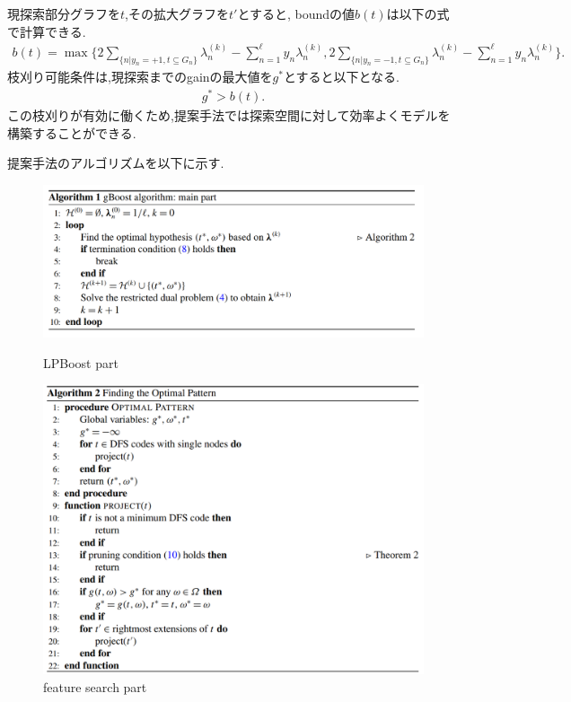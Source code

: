 \documentclass{zasshi-prml3}
\theoremstyle{definition}
\begin{document}
現探索部分グラフを$t$,その拡大グラフを$t'$とすると,
boundの値$b(t)$は以下の式で計算できる.
\begin{align}
	\label{eq:bound}
	b(t) = \max\{2 \sum_{\{n|y_{n}=+1, t \subseteq G_{n}\}} \lambda_{n}^{(k)} - \sum_{n=1}^{\ell} y_{n} \lambda_{n}^{(k)},	2 \sum_{\{n|y_{n}=-1, t \subseteq G_{n}\}} \lambda_{n}^{(k)} - \sum_{n=1}^{\ell} y_{n} \lambda_{n}^{(k)}\}.
\end{align}
枝刈り可能条件は,現探索までのgainの最大値を$g^{*}$とすると以下となる.
\begin{align}
	\label{eq:prune}
	g^{*} > b(t).
\end{align}
この枝刈りが有効に働くため,提案手法では探索空間に対して効率よくモデルを構築することができる.

提案手法のアルゴリズムを以下に示す.
\begin{figure}[h]
	\centering
	\includegraphics[width=140mm]{figure/algorithm1.png}
	\caption{LPBoost part}
	\includegraphics[width=140mm]{figure/algorithm2.png}
	\caption{feature search part}
\end{figure}
\end{document}
